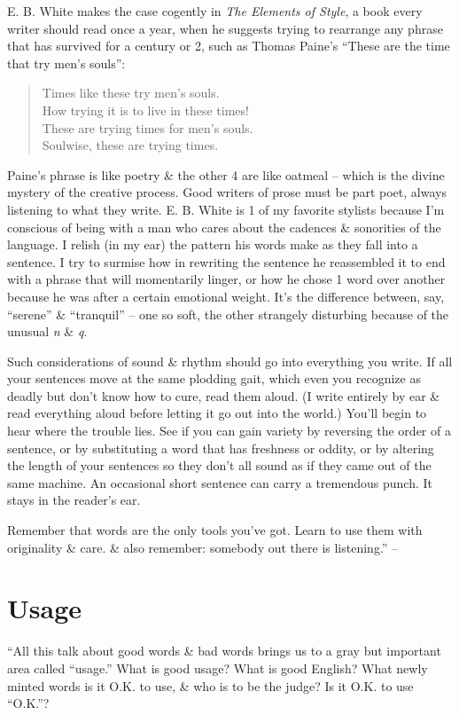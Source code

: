 \documentclass{article}
\begin{document}
E. B. White makes the case cogently in \textit{The Elements of Style}, a book every writer should read once a year, when he suggests trying to rearrange any phrase that has survived for a century or 2, such as Thomas Paine's ``These are the time that try men's souls'':
\begin{quote}
	Times like these try men's souls.\\How trying it is to live in these times!\\These are trying times for men's souls.\\Soulwise, these are trying times.
\end{quote}
Paine's phrase is like poetry \& the other 4 are like oatmeal -- which is the divine mystery of the creative process. Good writers of prose must be part poet, always listening to what they write. E. B. White is 1 of my favorite stylists because I'm conscious of being with a man who cares about the cadences \& sonorities of the language. I relish (in my ear) the pattern his words make as they fall into a sentence. I try to surmise how in rewriting the sentence he reassembled it to end with a phrase that will momentarily linger, or how he chose 1 word over another because he was after a certain emotional weight. It's the difference between, say, ``serene'' \& ``tranquil'' -- one so soft, the other strangely disturbing because of the unusual \textit{n} \& \textit{q}.

Such considerations of sound \& rhythm should go into everything you write. If all your sentences move at the same plodding gait, which even you recognize as deadly but don't know how to cure, read them aloud. (I write entirely by ear \& read everything aloud before letting it go out into the world.) You'll begin to hear where the trouble lies. See if you can gain variety by reversing the order of a sentence, or by substituting a word that has freshness or oddity, or by altering the length of your sentences so they don't all sound as if they came out of the same machine. An occasional short sentence can carry a tremendous punch. It stays in the reader's ear.

Remember that words are the only tools you've got. Learn to use them with originality \& care. \& also remember: somebody out there is listening.'' -- \cite[pp. 37--40]{Zinsser2016}


\section{Usage}
``All this talk about good words \& bad words brings us to a gray but important area called ``usage.'' What is good usage? What is good English? What newly minted words is it O.K. to use, \& who is to be the judge? Is it O.K. to use ``O.K.''?
\end{document}
